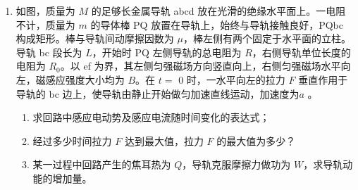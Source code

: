 \documentclass[\gkver]{gaokaozhenti}
\begin{document}
\begin{enumerate}
{（2）当 MN 中通以电流 $I$ 时，线圈所受安培力大小为

$F=kIiL$（$\frac{1}{{{r_1}}} - \frac{1}{{{r_2}}}$）

式中 $r_{1}$、$r_{2}$ 分别为 ab、cd 与 MN 的间距，$i$ 为线圈中的电流，$L$ 为 ab、cd 的长度。

$\frac{{{F_1}}}{{{F_2}}} = \frac{{{I_1}}}{{{I_2}}}$

（3）设 MN 中电流强度为 $I_{3}$ 时，线框所受安培力为 $F_{3}$。

由题设条件有

2$T_{0} = G\text{，}$2$T_{1} + F_{1} = G$，$F_{3} + G = \frac{{2{T_0}}}{g}$a

$\frac{{{I_1}}}{{{I_3}}} = \frac{{{F_1}}}{{{F_3}}} = \frac{{({T_0} - {T_1})g}}{{(a - g){T_0}}}$

${I_3} = \frac{{(a - g){T_0}}}{{({T_0} - {T_1})g}}{I_1}$
}

\item
如图，质量为 $M$ 的足够长金属导轨 abcd 放在光滑的绝缘水平面上。一电阻不计，质量为 $m$ 的导体棒 PQ 放置在导轨上，始终与导轨接触良好，PQbc 构成矩形。棒与导轨间动摩擦因数为 $\mu$，棒左侧有两个固定于水平面的立柱。导轨 bc 段长为 $L$，开始时 PQ 左侧导轨的总电阻为 $R$，右侧导轨单位长度的电阻为 $R_{0}$。以 ef 为界，其左侧匀强磁场方向竖直向上，右侧匀强磁场水平向左，磁感应强度大小均为 $B$。在 $t =$ 0 时，一水平向左的拉力 $F$ 垂直作用于导轨的 bc 边上，使导轨由静止开始做匀加速直线运动，加速度为$a$ 。
\begin{enumerate}
	\item
	求回路中感应电动势及感应电流随时间变化的表达式；
	\item
	经过多少时间拉力 $F$ 达到最大值，拉力 $F$ 的最大值为多少？
	\item
	某一过程中回路产生的焦耳热为 $Q$，导轨克服摩擦力做功为 $W$，求导轨动能的增加量。
\end{enumerate}
\onepicture[align=right, w=5.06cm]{}
\end{enumerate}
\end{document}
